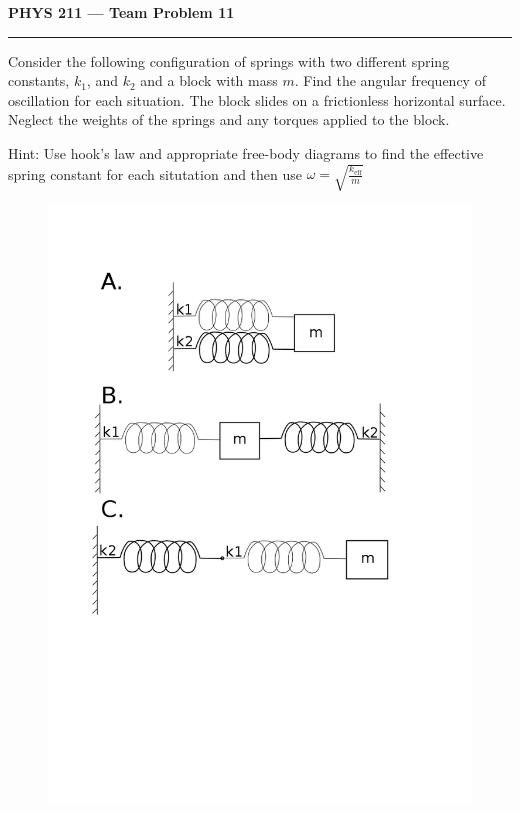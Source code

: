 \documentclass{article}
\begin{document}
\thispagestyle{empty}
\textbf{PHYS 211 --- Team Problem 11}
\hrule
\vspace{.3in}

Consider the following configuration of springs with two different spring constants, $k_1$, and $k_2$ and a block with mass $m$. Find the angular frequency of oscillation
for each situation. The block slides on a frictionless horizontal surface. Neglect the weights of the springs and any torques applied to the block.

Hint: Use hook's law and appropriate free-body diagrams to find the effective spring constant for each situtation and then use $\omega=\sqrt{\frac{k_{\text{eff}}}{m}}$

\begin{figure}[!ht]
  \centering
  \includegraphics[height=0.7\textheight]{figures/springs}
\end{figure}
\end{document}
